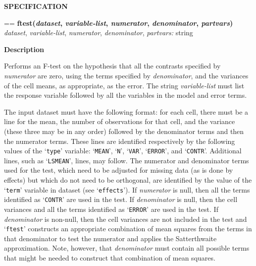 \documentclass{book}
\makeatletter
\newcommand\Texinfocommandstyletextvar[1]{{\normalfont{}\textsl{#1}}}%
\newenvironment{Texinfopreformatted}{%
  \par\GNUTobeylines\obeyspaces\frenchspacing\parskip=\z@\parindent=\z@}{}
{\catcode`\^^M=13 \gdef\GNUTobeylines{\catcode`\^^M=13 \def^^M{\null\par}}}
\newenvironment{Texinfoindented}{\begin{list}{}{}\item\relax}{\end{list}}
\renewcommand{\_}{\Texinfounderscore\discretionary{}{}{}}
\makeatother
\begin{document}
\noindent{}\textbf{SPECIFICATION}
\begin{Texinfoindented}
\begin{Texinfopreformatted}%
\textbf{ftest(\Texinfocommandstyletextvar{dataset}, \Texinfocommandstyletextvar{variable-list}, \Texinfocommandstyletextvar{numerator}, \Texinfocommandstyletextvar{denominator}, \Texinfocommandstyletextvar{partvars})}
\Texinfocommandstyletextvar{dataset}, \Texinfocommandstyletextvar{variable-list}, \Texinfocommandstyletextvar{numerator}, \Texinfocommandstyletextvar{denominator}, \Texinfocommandstyletextvar{partvars:} string
\end{Texinfopreformatted}
\end{Texinfoindented}
%

\noindent{}\textbf{Description}

Performs an F-test on the hypothesis that all the contrasts specified by \Texinfocommandstyletextvar{numerator}
are zero, using the terms specified by \Texinfocommandstyletextvar{denominator},
and the variances of the cell means, as appropriate, as the error.
The string \Texinfocommandstyletextvar{variable-list} must list the response variable followed by all the variables
in the model and error terms.

The input dataset
must have the following format: for each cell, there must be a line
for the mean, the number of observations for that cell, and the variance
(these three may be in any order)
followed by the denominator terms and then the numerator terms.
These lines are identified respectively by the following values
of the `\texttt{\_type\_}' variable: `\texttt{MEAN}', `\texttt{N}', `\texttt{VAR}', `\texttt{ERROR}', and `\texttt{CONTR}'.
Additional lines, such as `\texttt{LSMEAN}', lines, may follow.
The numerator and denominator terms used for the test,
which need to be adjusted for missing data (as is done by
effects) but which do not need to be orthogonal, are identified by the value of the
`\texttt{\_term\_}' variable in dataset (see `\texttt{effects}').
If \Texinfocommandstyletextvar{numerator} is null, then all the terms identified as
`\texttt{CONTR}' are used in the test.
If \Texinfocommandstyletextvar{denominator}
is null, then the cell variances and all the terms identified as
`\texttt{ERROR}' are used in the test.
If \Texinfocommandstyletextvar{denominator}
is non-null, then the cell variances are not included in the test and `\texttt{ftest}'
constructs an appropriate combination of mean squares
%
from the terms in
that denominator to test the numerator and applies the Satterthwaite
%
approximation.
Note, however, that \Texinfocommandstyletextvar{denominator}
must contain all possible terms that might be needed to construct that
combination of mean squares.
\end{document}
